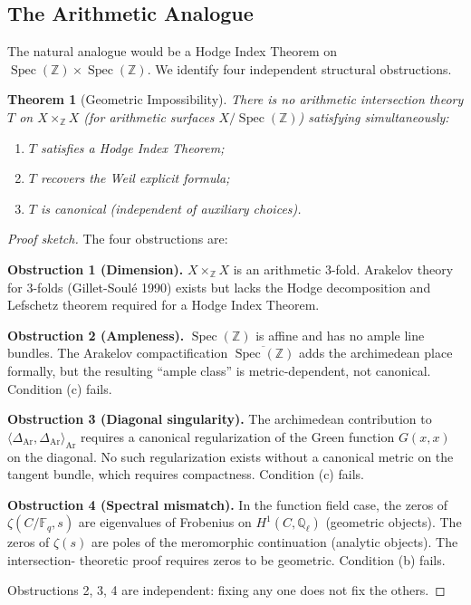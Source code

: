 \documentclass[12pt]{article}
\newtheorem{theorem}{Theorem}[section]
\DeclareMathOperator{\Spec}{Spec}
\newcommand{\ZZ}{\mathbb{Z}}
\begin{document}
\subsection{The Arithmetic Analogue}

The natural analogue would be a Hodge Index Theorem on
$\Spec(\ZZ) \times \Spec(\ZZ)$. We identify four independent structural
obstructions.

\begin{theorem}[Geometric Impossibility]
\label{thm:geometric}
There is no arithmetic intersection theory $T$ on $X \times_\ZZ X$
(for arithmetic surfaces $X/\Spec(\ZZ)$) satisfying simultaneously:
\begin{enumerate}
\item[(a)] $T$ satisfies a Hodge Index Theorem;
\item[(b)] $T$ recovers the Weil explicit formula;
\item[(c)] $T$ is canonical (independent of auxiliary choices).
\end{enumerate}
\end{theorem}

\begin{proof}[Proof sketch]
The four obstructions are:

\textbf{Obstruction 1 (Dimension).} $X \times_\ZZ X$ is an arithmetic
3-fold. Arakelov theory for 3-folds (Gillet-Soul\'e 1990) exists but lacks
the Hodge decomposition and Lefschetz theorem required for a Hodge Index
Theorem.

\textbf{Obstruction 2 (Ampleness).} $\Spec(\ZZ)$ is affine and has no
ample line bundles. The Arakelov compactification $\overline{\Spec(\ZZ)}$
adds the archimedean place formally, but the resulting ``ample class'' is
metric-dependent, not canonical. Condition (c) fails.

\textbf{Obstruction 3 (Diagonal singularity).} The archimedean contribution
to $\langle \Delta_{\mathrm{Ar}}, \Delta_{\mathrm{Ar}} \rangle_{\mathrm{Ar}}$
requires a canonical regularization of the Green function $G(x,x)$ on the
diagonal. No such regularization exists without a canonical metric on the
tangent bundle, which requires compactness. Condition (c) fails.

\textbf{Obstruction 4 (Spectral mismatch).} In the function field case,
the zeros of $\zeta(C/\mathbb{F}_q, s)$ are eigenvalues of Frobenius on
$H^1(C, \mathbb{Q}_\ell)$ (geometric objects). The zeros of $\zeta(s)$ are
poles of the meromorphic continuation (analytic objects). The intersection-
theoretic proof requires zeros to be geometric. Condition (b) fails.

Obstructions 2, 3, 4 are independent: fixing any one does not fix the others.
\end{proof}
\end{document}
